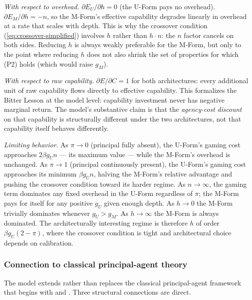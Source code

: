 \documentclass[11pt]{article}
\begin{document}
\emph{With respect to overhead.} $\partial E_U / \partial h = 0$ (the U-Form pays no overhead). $\partial E_M / \partial h = -n$, so the M-Form's effective capability degrades linearly in overhead at a rate that scales with depth. This is why the crossover condition (\ref{eq:crossover-simplified}) involves $h$ rather than $h \cdot n$: the $n$ factor cancels on both sides. Reducing $h$ is always weakly preferable for the M-Form, but only to the point where reducing $h$ does not also shrink the set of properties for which (P2) holds (which would raise $g_M$).

\emph{With respect to raw capability.} $\partial E / \partial C = 1$ for both architectures: every additional unit of raw capability flows directly to effective capability. This formalizes the Bitter Lesson at the model level: capability investment never has negative marginal return. The model's substantive claim is that the \emph{agency-cost discount} on that capability is structurally different under the two architectures, not that capability itself behaves differently.

\emph{Limiting behavior.} As $\pi \to 0$ (principal fully absent), the U-Form's gaming cost approaches $2 \beta g_U n$ --- its maximum value --- while the M-Form's overhead is unchanged. As $\pi \to 1$ (principal continuously present), the U-Form's gaming cost approaches its minimum $\beta g_U n$, halving the M-Form's relative advantage and pushing the crossover condition toward its harder regime. As $n \to \infty$, the gaming term dominates any fixed overhead in the U-Form regardless of $\pi$; the M-Form pays for itself for any positive $g_U$ given enough depth. As $h \to 0$ the M-Form trivially dominates whenever $g_U > g_M$. As $h \to \infty$ the M-Form is always dominated. The architecturally interesting regime is therefore $h$ of order $\beta g_U (2 - \pi)$, where the crossover condition is tight and architectural choice depends on calibration.

\subsubsection{Connection to classical principal-agent theory}

The model extends rather than replaces the classical principal-agent framework that begins with \citet{holmstrom1979} and \citet{jensen1976}. Three structural connections are direct.
\end{document}
